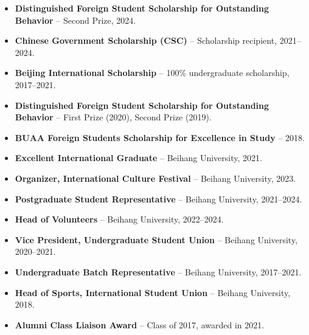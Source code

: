 \documentclass[a4paper,11pt]{article}
\begin{document}
\begin{itemize}[leftmargin=*, itemsep=2pt, topsep=2pt]

  \item \textbf{Distinguished Foreign Student Scholarship for Outstanding Behavior} -- Second Prize, 2024.

  \item \textbf{Chinese Government Scholarship (CSC)} -- Scholarship recipient, 2021--2024.

  \item \textbf{Beijing International Scholarship} -- 100\% undergraduate scholarship, 2017--2021.

  \item \textbf{Distinguished Foreign Student Scholarship for Outstanding Behavior} -- First Prize (2020), Second Prize (2019).

  \item \textbf{BUAA Foreign Students Scholarship for Excellence in Study} -- 2018.

  \item \textbf{Excellent International Graduate} -- Beihang University, 2021.

  \item \textbf{Organizer, International Culture Festival} -- Beihang University, 2023.

  \item \textbf{Postgraduate Student Representative} -- Beihang University, 2021--2024.

  \item \textbf{Head of Volunteers} -- Beihang University, 2022--2024.

  \item \textbf{Vice President, Undergraduate Student Union} -- Beihang University, 2020--2021.

  \item \textbf{Undergraduate Batch Representative} -- Beihang University, 2017--2021.

  \item \textbf{Head of Sports, International Student Union} -- Beihang University, 2018.

  \item \textbf{Alumni Class Liaison Award} -- Class of 2017, awarded in 2021.

\end{itemize}

\end{document}
